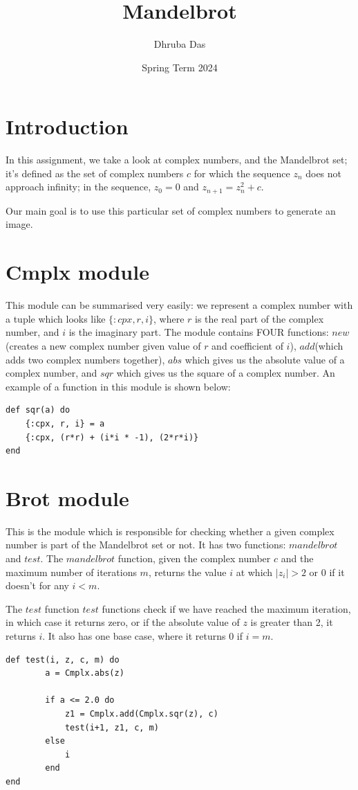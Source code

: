 \documentclass[a4paper,11pt]{article}
\begin{document}
\title{
    \textbf{Mandelbrot}
}
\author{Dhruba Das}
\date{Spring Term 2024}

\maketitle

\section*{Introduction}
In this assignment, we take a look at complex numbers, and the Mandelbrot set; it's defined as the set of complex numbers $c$ for which the sequence $z_n$ does not approach infinity; in the sequence, $z_0 = 0$ and $z_{n+1} = z_n^2 + c$.

Our main goal is to use this particular set of complex numbers to generate an image.


\section*{Cmplx module}
This module can be summarised very easily: we represent a complex number with a tuple which looks like $\{:cpx, r, i\}$, where $r$ is the real part of the complex number, and $i$ is the imaginary part. The module contains FOUR functions: $new$ (creates a new complex number given value of $r$ and coefficient of $i$), $add$(which adds two complex numbers together), $abs$ which gives us the absolute value of a complex number, and $sqr$ which gives us the square of a complex number. An example of a function in this module is shown below:
\begin{verbatim}
def sqr(a) do
    {:cpx, r, i} = a
    {:cpx, (r*r) + (i*i * -1), (2*r*i)}
end
\end{verbatim}


\section*{Brot module}
This is the module which is responsible for checking whether a given complex number is part of the Mandelbrot set or not. It has two functions: $mandelbrot$ and $test$.
The $mandelbrot$ function, given the complex number $c$ and the maximum number of iterations $m$, returns the value $i$ at which $\lvert z_i \rvert > 2$ or 0 if it doesn't for any  $i < m$.

The $test$ function $test$ functions check if we have reached the maximum iteration, in which case it returns zero, or if the absolute value of $z$ is greater than 2, it returns $i$. It also has one base case, where it returns 0 if $i = m$.
\begin{verbatim}
def test(i, z, c, m) do
        a = Cmplx.abs(z)

        if a <= 2.0 do 
            z1 = Cmplx.add(Cmplx.sqr(z), c)
            test(i+1, z1, c, m)
        else
            i
        end
end
\end{verbatim}
\end{document}
